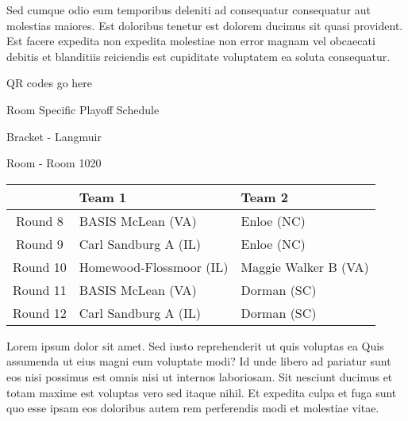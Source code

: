 \documentclass{article}%
\begin{document}
\newline%
Sed cumque odio eum temporibus deleniti ad consequatur consequatur aut molestias maiores. Est doloribus tenetur est dolorem ducimus sit quasi provident. Est facere expedita non expedita molestiae non error magnam vel obcaecati debitis et blanditiis reiciendis est cupiditate voluptatem ea soluta consequatur.%
\vspace*{140pt}%
\begin{center}%
\begin{Huge}%
QR codes go here%
\end{Huge}%
\end{center}%
\newpage%
\begin{center}%
\begin{Huge}%
Room Specific Playoff Schedule%
\end{Huge}%
\vspace*{8pt}%
\linebreak%
\begin{Large}%
Bracket {-} Langmuir%
\end{Large}%
\vspace*{8pt}%
\linebreak%
\vspace*{8pt}%
\begin{Large}%
Room {-} Room 1020%
\end{Large}%
\end{center}%
%
\begin{tabularx}{\textwidth}{|c|Y|Y|}%
\hline%
&Team 1&Team 2\\%
\hline%
Round 8&BASIS McLean (VA)&Enloe (NC)\\%
Round 9&Carl Sandburg A (IL)&Enloe (NC)\\%
Round 10&Homewood{-}Flossmoor (IL)&Maggie Walker B (VA)\\%
Round 11&BASIS McLean (VA)&Dorman (SC)\\%
Round 12&Carl Sandburg A (IL)&Dorman (SC)\\%
\hline%
\end{tabularx}%
\vspace*{8pt}%
\newline%
Lorem ipsum dolor sit amet. Sed iusto reprehenderit ut quis voluptas ea Quis assumenda ut eius magni eum voluptate modi? Id unde libero ad pariatur sunt eos nisi possimus est omnis nisi ut internos laboriosam. Sit nesciunt ducimus et totam maxime est voluptas vero sed itaque nihil. Et expedita culpa et fuga sunt quo esse ipsam eos doloribus autem rem perferendis modi et molestiae vitae.\newline%
\end{document}

